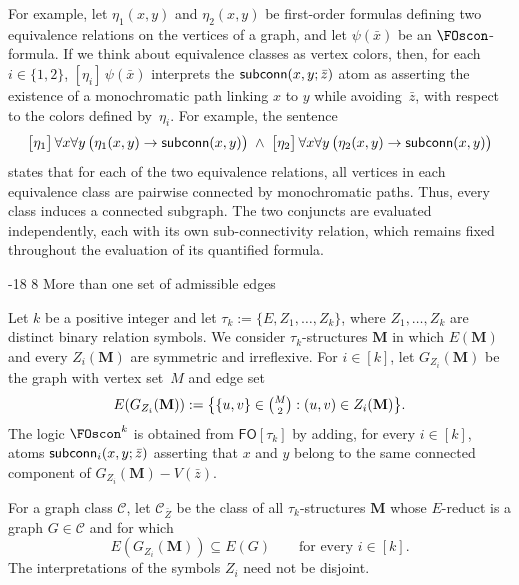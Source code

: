 \documentclass[1p,number,11pt]{elsarticle}
\makeatletter
\renewcommand\subsection{\@startsection{subsection}{2}{\z@}%
  {-18\p@ \@plus -4\p@ \@minus -4\p@}%
  {8\p@ \@plus 4\p@ \@minus 4\p@}%
  {\normalfont\normalsize\bfseries}}
\newcommand{\scon}{\hbox{\sf subconn}}
\theoremstyle{plain}
\newcommand{\Cc}{\mathscr{C}}
\renewcommand{\FO}{\ensuremath{\mathsf{FO}}}
\makeatother
\begin{document}
For example, let $\eta_1(x,y)$ and $\eta_2(x,y)$ be first-order
formulas defining two equivalence relations on the vertices of a
graph, and let $\psi(\bar x)$ be an $\FOscon$-formula. If we think
about equivalence classes as vertex colors, then, for each
$i\in\{1,2\}$, $[\eta_i]\,\psi(\bar x)$ interprets the
$\scon(x,y;\bar z)$ atom as asserting the existence of a
monochromatic path linking $x$ to $y$ while avoiding~$\bar z$,
with respect to the colors defined by~$\eta_i$.
For example, the sentence
\begin{equation*}
 \bigl[\eta_1\bigr]\,
 \forall x\forall y\,
 \bigl(\eta_1(x,y)\rightarrow\scon(x,y)\bigr)
 \;\wedge\;
 \bigl[\eta_2\bigr]\,
 \forall x\forall y\,
 \bigl(\eta_2(x,y)\rightarrow\scon(x,y)\bigr)
\end{equation*}
states that for each of the two equivalence relations,
all vertices in each equivalence class are pairwise connected
by monochromatic paths. Thus, every class induces a connected
subgraph. The two conjuncts are evaluated independently, each
with its own sub-connectivity relation, which remains fixed
throughout the evaluation of its quantified formula.

\subsection{More than one set of admissible edges}\label{subsec-hard-several-color}

Let $k$ be a positive integer and let
$\tau_k:=\{E,Z_1,\ldots,Z_k\}$, 
where $Z_1,\ldots,Z_k$ are distinct binary relation symbols. We consider
$\tau_k$-structures $\mathbf M$ in which $E(\mathbf M)$ and every
$Z_i(\mathbf M)$ are symmetric and irreflexive. For $i\in[k]$, let
$G_{Z_i}(\mathbf M)$ be the graph with vertex set~$M$ and edge set
\[
   E(G_{Z_i}(\mathbf M))
   :=
   \bigl\{\{u,v\}\in\tbinom{M}{2}:(u,v)\in Z_i(\mathbf M)\bigr\}.
\]
The logic $\FOscon^k$ is obtained from $\FO[\tau_k]$ by adding, for every
$i\in[k]$, atoms $\scon_i(x,y;\bar z)$ asserting that $x$ and $y$ belong to
the same connected component of $G_{Z_i}(\mathbf M)-V(\bar z)$.

For a graph class $\Cc$, let $\Cc_{\bar Z}$ be the class of all
$\tau_k$-structures $\mathbf M$ whose $E$-reduct is a graph $G\in\Cc$ and
for which
\[
   E(G_{Z_i}(\mathbf M))\subseteq E(G)
   \qquad\text{for every }i\in[k].
\]
The interpretations of the symbols $Z_i$ need not be disjoint.
\end{document}
